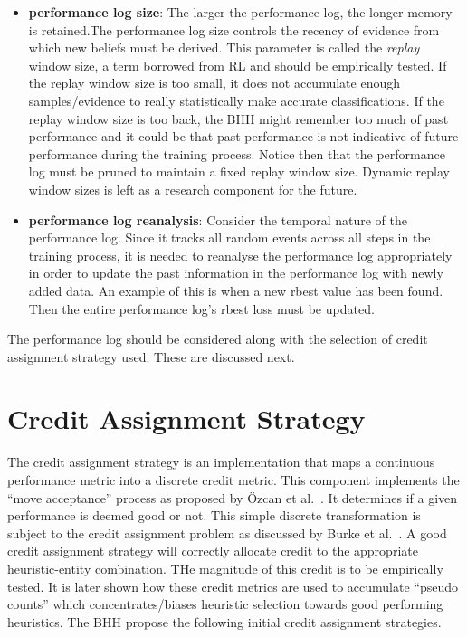 \begin{itemize}
      \item \textbf{performance log size}: The larger the performance log, the longer memory is retained.The performance log size controls the recency of evidence from which new beliefs must be derived. This parameter is called the \textit{replay} window size, a term borrowed from \ac{RL} and should be empirically tested. If the replay window size is too small, it does not accumulate enough samples/evidence to really statistically make accurate classifications. If the replay window size is too back, the \ac{BHH} might remember too much of past performance and it could be that past performance is not indicative of future performance during the training process. Notice then that the performance log must be pruned to maintain a fixed replay window size. Dynamic replay window sizes is left as a research component for the future.

      \item \textbf{performance log reanalysis}: Consider the temporal nature of the performance log. Since it tracks all random events across all steps in the training process, it is needed to reanalyse the performance log appropriately in order to update the past information in the performance log with newly added data. An example of this is when a new rbest value has been found. Then the entire performance log's rbest loss must be updated.
\end{itemize}

The performance log should be considered along with the selection of credit assignment strategy used. These are discussed next.


\section{Credit Assignment Strategy}
\label{sec:bhh:credit_assignment_strategy}

The credit assignment strategy is an implementation that maps a continuous performance metric into a discrete credit metric. This component implements the ``move acceptance'' process as proposed by Özcan et al.~\cite{ref:ozcan:2006,ref:ozcan:2008}. It determines if a given performance is deemed good or not. This simple discrete transformation is subject to the credit assignment problem as discussed by Burke et al.~\cite{ref:burke:2010}. A good credit assignment strategy will correctly allocate credit to the appropriate heuristic-entity combination. THe magnitude of this credit is to be empirically tested.  It is later shown how these credit metrics are used to accumulate ``pseudo counts'' which concentrates/biases heuristic selection towards good performing heuristics. The \ac{BHH} propose the following initial credit assignment strategies.


